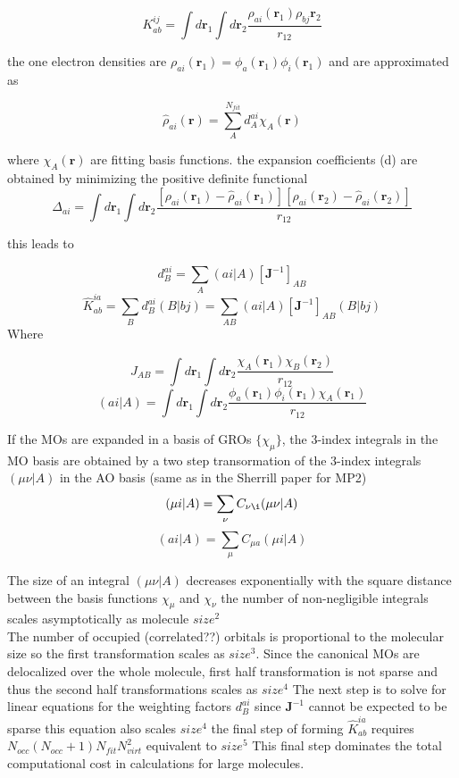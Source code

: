 \documentclass[10pt, draft]{article}
\begin{document}
	   \[ K_{ab}^{ij} = \int d\textbf{r}_1 \int d\textbf{r}_2 \frac{\rho_{ai}(\textbf{r}_1)\rho_{bj}\textbf{r}_2}{r_{12}}\]
	  
	   the one electron densities are $\rho_{ai}(\textbf{r}_1) = \phi_a(\textbf{r}_1)\phi_i(\textbf{r}_1)$ and are approximated as 
	  
	   \[ \hat{\rho}_{ai}(\textbf{r}) = \sum_A^{N_{fit}} d_A^{ai}\chi_A(\textbf{r})\]
	   
	  where $\chi_A(\textbf{r})$ are fitting basis functions.  the expansion coefficients (d) are obtained by minimizing the positive definite functional
	  \[\Delta_{ai} = \int d\textbf{r}_1 \int d\textbf{r}_2 \frac{[\rho_{ai}(\textbf{r}_1) - \hat{\rho}_{ai}(\textbf{r}_1)][\rho_{ai}(\textbf{r}_2) - \hat{\rho}_{ai}(\textbf{r}_2)]}{r_{12}}\]
	  
	  this leads to 
	  
	\[d_B^{ai} = \sum_A (ai|A)[\textbf{J}^{-1}]_{AB}\]
	\[\hat{K}_{ab}^{ia} =   \sum_B d_B^{ai}(B|bj) = \sum_{AB}(ai|A)[\textbf{J}^{-1}]_{AB}(B|bj)\]
	Where
	
	\[J_{AB} = \int d\textbf{r}_1 \int d\textbf{r}_2  \frac{\chi_A(\textbf{r}_1) \chi_B(\textbf{r}_2)} {r_{12}} \]
	\[ (ai|A) = \int d\textbf{r}_1 \int d\textbf{r}_2  \frac{ \phi_a(\textbf{r}_1) \phi_i(\textbf{r}_1) \chi_A(\textbf{r}_1) } {r_{12}}\] 
	
	If the MOs are expanded in a basis of GROs $\{\chi_\mu\}$, the 3-index integrals in the MO basis are obtained by a two step transormation of the 3-index integrals $(\mu\nu|A)$ in the AO basis (same as in the Sherrill paper for MP2)
	\[(\mu i|A) = \sum_\nu C_{\nu\i}(\mu\nu|A) \]
	\[(ai|A) = \sum_\mu C_{\mu a}(\mu i |A) \] 
	
	The size of an integral $(\mu\nu|A)$ decreases exponentially with the square distance between the basis functions $\chi_\mu$ and $\chi_\nu$ the number of non-negligible integrals scales asymptotically as molecule $size^2$\\
	The number of occupied (correlated??) orbitals is proportional to the molecular size so the first transformation scales as $size^3$.  Since the canonical MOs are delocalized over the whole molecule, first half transformation is not sparse and thus the second half transformations scales as $size^4$ The next step is to solve for linear equations for the weighting factors $d_B^{ai}$ since $\textbf{J}^{-1}$ cannot be expected to be sparse this equation also scales $size^4$ the final step of forming $\hat{K}_{ab}^{ia}$ requires $N_{occ}(N_{occ} + 1)N_{fit}N^2_{virt}$ equivalent to $size^5$  This final step dominates the total computational cost in calculations for large molecules. 
	
\end{document}
